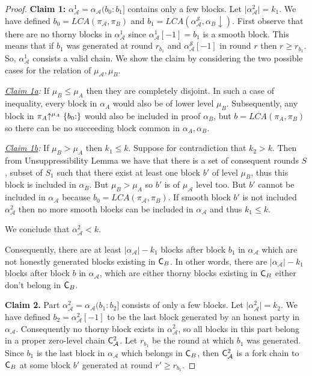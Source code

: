 \begin{proof}
\textbf{Claim 1:} $\alpha_\mathcal{A}^1 = \alpha_\mathcal{A}(b_0 : b_1]$ contains only a few blocks. Let $\lvert \alpha^2_\mathcal{A} \rvert = k_1$. We have defined $b_0 = LCA(\pi_\mathcal{A}, \pi_B)$ and $b_1 = LCA(\alpha^{\mathcal{S}}_\mathcal{A}, \alpha_B \downarrow)$. First observe that there are no thorny blocks in $\alpha_\mathcal{A}^1$ since $\alpha_\mathcal{A}^1[-1] = b_1$ is a smooth block. This means that if $b_1$ was generated at round $r_{b_1}$ and $\alpha^{\mathcal{S}}_\mathcal{A}[-1]$ in round $r$ then $r \geq r_{b_1}$. So, $\alpha_\mathcal{A}^1$ consists a valid chain. We show the claim by considering the two possible cases for the relation of $\mu_\mathcal{A}, \mu_B$.

\textit{\underline{Claim 1a}:} If $\mu_B \leq \mu_A$ then they are completely disjoint. In such a case of inequality, every block in $\alpha_A$ would also be of lower level $\mu_B$. Subsequently, any block in $\pi_A\negthickspace\uparrow^{\mu_A}\{b_0{:}\}$ would also be included in proof $\alpha_B$, but $b=LCA(\pi_A, \pi_B)$ so there can be no succeeding block common in $\alpha_A, \alpha_B$.

\textit{\underline{Claim 1b}:} If  $\mu_B > \mu_A$ then $ k_1 \leq k$. Suppose for contradiction that $k_2 > k$. Then from Unsuppressibility Lemma we have that there is a set of consequent rounds $S$, subset of $S_1$ such that there exist at least one block $b'$ of level $\mu_B$, thus this block is included in $\alpha_B$. But $\mu_B > \mu_A$ so $b'$ is of $\mu_\mathcal{A}$ level too. But $b'$ cannot be included in $\alpha_\mathcal{A}$ because $b_0 = LCA(\pi_\mathcal{A}, \pi_B)$. If smooth block $b'$ is not included $\alpha^2_\mathcal{A}$ then no more smooth blocks can be included in $\alpha_\mathcal{A}$ and thus $k_1 \leq k$.

We conclude that $\alpha^2_\mathcal{A} < k$.

Consequently, there are at least $\lvert\alpha_\mathcal{A}\rvert - k_1$ blocks after block $b_1$ in $\alpha_\mathcal{A}$ which are not honestly generated blocks existing in $\mathsf{C}_B$. In other words, there are $\vert \alpha_\mathcal{A} \vert - k_1$ blocks after block $b$ in $\alpha_\mathcal{A}$, which are either thorny blocks existing in $\mathsf{C}_B$ either don't belong in $\mathsf{C}_B$.

\textbf{Claim 2.}
Part $\alpha_\mathcal{A}^2 = \alpha_\mathcal{A}(b_1:b_2]$ consists of only a few blocks. Let $ \lvert \alpha_\mathcal{A}^2 \rvert = k_2$. We have defined $b_2 = \alpha_\mathcal{A}^2[-1]$ to be the last block generated by an honest party in $\alpha_\mathcal{A}$. Consequently no thorny block exists in $\alpha_\mathcal{A}^2$, so all blocks in this part belong in a proper zero-level chain $\mathsf{C}_\mathcal{A}^2$.  Let $r_{b_1}$ be the round at which $b_1$ was generated. Since $b_1$ is the last block in $\alpha_\mathcal{A}$ which belongs in $\mathsf{C}_B$, then $\mathsf{C}_\mathcal{A}^2$ is a fork chain to $\mathsf{C}_B$ at some block $b'$ generated at round $r' \geq r_{b_1}$.


\end{proof}
